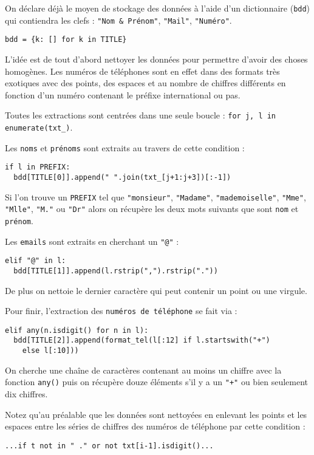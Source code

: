 On déclare déjà le moyen de stockage des données à l'aide d'un dictionnaire (\texttt{bdd}) qui contiendra les clefs : \texttt{"Nom \& Prénom"}, \texttt{"Mail"}, \texttt{"Numéro"}.
\begin{lstlisting}
bdd = {k: [] for k in TITLE}
\end{lstlisting}
\medskip

L'idée est de tout d'abord nettoyer les données pour permettre d'avoir des choses homogènes. Les numéros de téléphones sont en effet dans des formats très exotiques avec des points, des espaces et au nombre de chiffres différents en fonction d'un numéro contenant le préfixe international ou pas.
\medskip

Toutes les extractions sont centrées dans une seule boucle : \texttt{for j, l in enumerate(txt\_)}.
\medskip

Les \texttt{noms} et \texttt{prénoms} sont extraits au travers de cette condition :
\begin{lstlisting}
if l in PREFIX:
  bdd[TITLE[0]].append(" ".join(txt_[j+1:j+3])[:-1])
\end{lstlisting}
\medskip

Si l'on trouve un \texttt{PREFIX} tel que \texttt{"monsieur"}, \texttt{"Madame"}, \texttt{"mademoiselle"}, \texttt{"Mme"}, \texttt{"Mlle"}, \texttt{"M."} ou \texttt{"Dr"} alors on récupère les deux mots suivants que sont \texttt{nom} et \texttt{prénom}.
\medskip

Les \texttt{emails} sont extraits en cherchant un \texttt{"@"} :
\begin{lstlisting}
elif "@" in l:
  bdd[TITLE[1]].append(l.rstrip(",").rstrip("."))
\end{lstlisting}
\medskip

De plus on nettoie le dernier caractère qui peut contenir un point ou une virgule.
\medskip

Pour finir, l'extraction des \texttt{numéros de téléphone} se fait via :
\begin{lstlisting}
elif any(n.isdigit() for n in l):
  bdd[TITLE[2]].append(format_tel(l[:12] if l.startswith("+") 
  	else l[:10]))
\end{lstlisting}
\medskip

On cherche une chaîne de caractères contenant au moins un chiffre avec la fonction \texttt{any()} puis on récupère douze éléments s'il y a un \texttt{"+"} ou bien seulement dix chiffres.
\medskip

Notez qu'au préalable que les données sont nettoyées en enlevant les points et les espaces entre les séries de chiffres des numéros de téléphone par cette condition :
\begin{lstlisting}
...if t not in " ." or not txt[i-1].isdigit()...
\end{lstlisting}
\medskip

